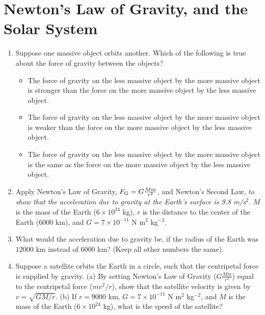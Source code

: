 \documentclass[10pt]{article}
\begin{document}
\section{Newton's Law of Gravity, and the Solar System}
\begin{enumerate}
\item Suppose one massive object orbits another.  Which of the following is true about the force of gravity between the objects?
\begin{itemize}
\item The force of gravity on the less massive object by the more massive object is stronger than the force on the more massive object by the less massive object.
\item The force of gravity on the less massive object by the more massive object is weaker than the force on the more massive object by the less massive object.
\item The force of gravity on the less massive object by the more massive object is the same as the force on the more massive object by the less massive object.
\end{itemize}
\item Apply Newton's Law of Gravity, $F_{\rm G} = G\frac{M m}{r^2}$, and Newton's Second Law, \textit{to show that the acceleration due to gravity at the Earth's surface is 9.8 m/s$^2$}.  $M$ is the mass of the Earth ($6\times 10^{24}$ kg), $r$ is the distance to the center of the Earth ($6000$ km), and $G = 7 \times 10^{-11}$ N m$^2$ kg$^{-2}$. \\ \vspace{2cm}
\item What would the acceleration due to gravity be, if the radius of the Earth was $12000$ km instead of $6000$ km? (Keep all other numbers the same). \\ \vspace{2cm}
\item Suppose a satellite orbits the Earth in a circle, such that the centripetal force is supplied by gravity.  (a) By setting Newton's Law of Gravity ($G\frac{M m}{r^2}$) equal to the centripetal force ($mv^2/r$), show that the satellite velocity is given by $v = \sqrt{GM/r}$. (b)  If $r = 9000$ km, $G = 7 \times 10^{-11}$ N m$^2$ kg$^{-2}$, and $M$ is the mass of the Earth ($6\times 10^{24}$ kg), what is the speed of the satellite?
\end{enumerate}
\end{document}
